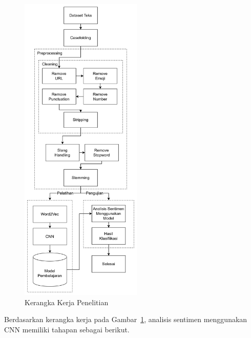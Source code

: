 \begin{figure}[H]
  \centering
  \includegraphics[width=\textwidth, height=15cm, keepaspectratio]{assets/kerangka_kerja_penelitian.png}
  \caption{Kerangka Kerja Penelitian}
  \label{fig:kerangka_kerja_penelitian}
\end{figure}

Berdasarkan kerangka kerja pada Gambar~\ref{fig:kerangka_kerja_penelitian}, analisis sentimen menggunakan
CNN memiliki tahapan sebagai berikut.


